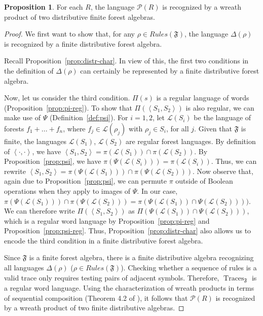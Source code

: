 \documentclass[sigplan,9pt]{acmart}\settopmatter{printfolios=true,printccs=false,printacmref=false}
\newcounter{thm}
\newcounter{theorem}
\theoremstyle{definition}
\newtheorem{prop}[thm]{Proposition}
\newcommand{\La}[0]{{\mathcal{L}}}
\newcommand{\Ff}[0]{{\mathfrak{F}}}
\newcommand{\Pa}[0]{{\mathcal{P}}}
\newcommand{\Trace}[0]{\operatorname{Traces}}
\begin{document}
\begin{prop}
For each $R$, the language $\Pa(R)$ is recognized by a wreath product of two distributive finite forest algebras.
\end{prop}

\begin{proof}
We first want to show that, for any $\rho \in Rules(\Ff)$, the language $\Delta(\rho)$ is recognized by a finite distributive forest algebra.

Recall Proposition~\ref{prop:distr-char}.
In view of this, the first two conditions in the definition of $\Delta(\rho)$ can certainly be represented by a finite distributive forest algebra.

Now, let us consider the third condition.
$\Pi(s)$ is a regular language of words (Proposition~\ref{prop:pi-reg}).
To show that $\Pi(\left\langle S_1, S_2\right\rangle)$ is also regular, we can make use of $\Psi$ (Definition~\ref{def:psi}).
For $i = 1,2$, let $\La(S_i)$ be the language of forests $f_1 + ... + f_n$, where $f_j \in \La(\rho_j)$ with $\rho_j \in S_i$, for all $j$.
Given that $\Ff$ is finite, the languages $\La(S_1)$, $\La(S_2)$ are regular forest languages.
By definition of $\left\langle\cdot,\cdot\right\rangle$, we have $\left\langle S_1, S_2\right\rangle = \pi(\La(S_1)) \cap \pi(\La(S_2))$.
By Proposition~\ref{prop:psi}, we have $\pi(\Psi(\La(S_i))) = \pi(\La(S_i))$.
Thus, we can rewrite 
$\left\langle S_1, S_2\right\rangle = \pi(\Psi(\La(S_1))) \cap \pi(\Psi(\La(S_2)))$.
Now observe that, again due to Proposition~\ref{prop:psi}, we can permute $\pi$ outside of Boolean operations when they apply to images of $\Psi$. In our case,
$\pi(\Psi(\La(S_1))) \cap \pi(\Psi(\La(S_2))) = \pi(\Psi(\La(S_1)) \cap \Psi(\La(S_2))))$.
We can therefore write $\Pi(\left\langle S_1, S_2\right\rangle)$ as $\Pi(\Psi(\La(S_1)) \cap \Psi(\La(S_2)))$, which is a regular word language by Proposition~\ref{prop:pi-reg} and Proposition~\ref{prop:psi-reg}.
Thus, Proposition~\ref{prop:distr-char} also allows us to encode the third condition in a finite distributive forest algebra.

Since $\Ff$ is a finite forest algebra, there is a finite distributive algebra recognizing all languages $\Delta(\rho)$ ($\rho \in Rules(\Ff)$).
Checking whether a sequence of rules is a valid trace only requires testing pairs of adjacent symbols.
Therefore, $\Trace_\Ff$ is a regular word language.
Using the characterization of wreath products in terms of sequential composition (Theorem 4.2 of \cite{bojanczyk-wreath-2012}), it follows that $\Pa(R)$ is recognized by a wreath product of two finite distributive algebras.
\end{proof}
\end{document}
